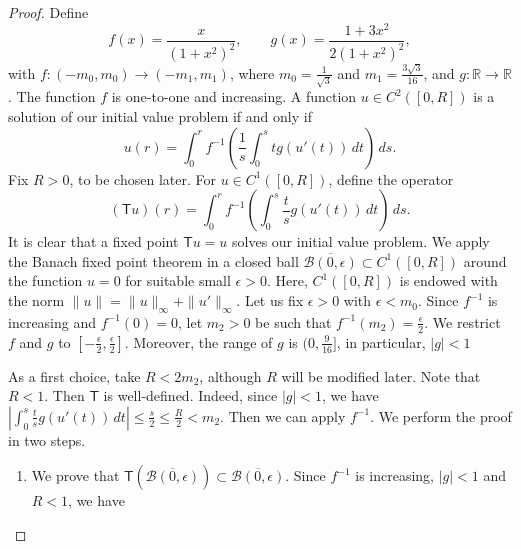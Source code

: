 \documentclass[preprint,11pt]{elsarticle}
\theoremstyle{definition}
\def\r{\mathbb R}
\begin{document}
\begin{proof} Define 
$$f(x)=\frac{x}{(1+x^2)^2} ,\qquad g(x)=\frac{1+3x^2}{2(1+x^2)^2},$$
with $f:(-m_0,m_0)\to (-m_1,m_1)$, where $m_0=\frac{1}{\sqrt{3}}$ and $m_1= \frac{3\sqrt{3}}{16}$, and $g:\r\to\r$. The function $f$ is one-to-one and   increasing. A function $u\in C^2([0,R])$ is a solution of our initial value problem if and only if
 $$u(r)= \int_0^rf^{-1}\left(\frac{1}{s}\int_0^s tg(u'(t))\, dt\right)\, ds.$$
 Fix $R>0$, to be chosen later. For $u\in C^1([0,R])$, define the operator 
$$
( \mathsf{T} u)(r)=\int_0^r f^{-1}\left( \int_0^s\frac{t}{s}g(u'(t))\, dt\right)\, ds.
$$
It is clear that a fixed point  $\mathsf{T}u=u$ solves our initial value problem. We apply the Banach fixed point theorem in a closed ball $\overline{\mathcal{B}(0,\epsilon)}\subset C^1([0,R])$ around the function $u=0$ for suitable small $\epsilon>0$. Here, $C^1([0,R])$ is endowed with the norm $\|u\|=\|u\|_\infty+\|u'\|_\infty$. Let us fix $\epsilon>0$ with $\epsilon<m_0$. Since $f^{-1}$ is increasing  and $f^{-1}(0)=0$, let $m_2>0$ be such that $f^{-1}(m_2)=\frac{\epsilon}{2}$. We restrict $f$ and $g$ to   $[-\frac{\epsilon}{2},\frac{\epsilon}{2}]$. Moreover, the range of $g$ is $(0,\frac{9}{16}]$, in particular, $|g|<1$

As a first choice, take $R<2m_2 $, although  $R$ will be modified later. Note that $R<1$. Then $ \mathsf{T}$ is well-defined. Indeed, since $|g|<1$, we have 
$ \left|\int_0^s\frac{t}{s}g(u'(t))\, dt\right|\leq \frac{s}{2}\leq \frac{R}{2}<m_2$. Then we can apply $f^{-1}$.  We perform the proof in two steps.


\begin{enumerate}
\item We prove that $ \mathsf{T}(\overline{\mathcal{B}(0,\epsilon)})\subset \overline{\mathcal{B}(0,\epsilon)}$. Since $ f^{-1}$ is increasing, $|g|<1$ and $R<1$, we have


\end{enumerate}
\end{proof}
\end{document}
